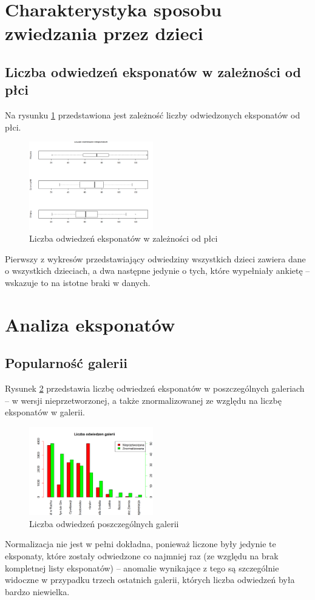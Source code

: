 \documentclass[conference]{IEEEtran}
\begin{document}
\section{Charakterystyka sposobu zwiedzania przez dzieci}
\subsection{Liczba odwiedzeń eksponatów w zależności od płci}
Na rysunku \ref{odwiedziny_plcie} przedstawiona jest zależność liczby odwiedzonych eksponatów od płci.
\begin{figure}[H]
\includegraphics[width=0.48\textwidth]{odwiedziny_plcie.png}
\caption{Liczba odwiedzeń eksponatów w zależności od płci}
\label{odwiedziny_plcie}
\end{figure}
Pierwszy z wykresów przedstawiający odwiedziny wszystkich dzieci zawiera dane o wszystkich dzieciach, a dwa następne jedynie o tych, które wypełniały ankietę -- wskazuje to na istotne braki w danych.

\section{Analiza eksponatów}
\subsection{Popularność galerii}
Rysunek \ref{galerie} przedstawia liczbę odwiedzeń eksponatów w poszczególnych galeriach -- w wersji nieprzetworzonej, a także znormalizowanej ze względu na liczbę eksponatów w galerii.
\begin{figure}[H]
\includegraphics[width=0.48\textwidth]{galerie.png}
\caption{Liczba odwiedzeń poszczególnych galerii}
\label{galerie}
\end{figure}
Normalizacja nie jest w pełni dokładna, ponieważ liczone były jedynie te eksponaty, które zostały odwiedzone co najmniej raz (ze względu na brak kompletnej listy eksponatów) -- anomalie wynikające z tego są szczególnie widoczne w przypadku trzech ostatnich galerii, których liczba odwiedzeń była bardzo niewielka.
\end{document}
